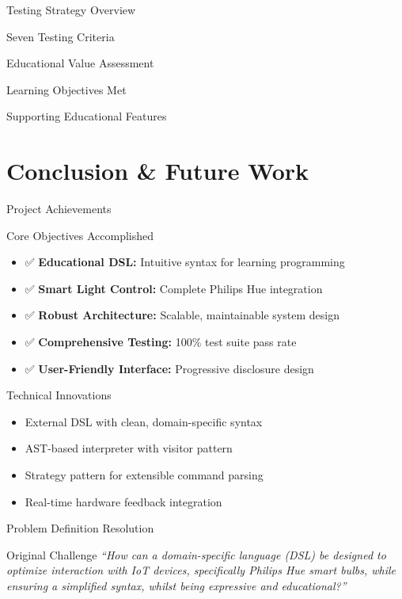 \documentclass{beamer}
\begin{document}
\begin{frame}{Testing Strategy Overview}
\begin{block}{Seven Testing Criteria}
\begin{frame}{Educational Value Assessment}
\begin{block}{Learning Objectives Met}
\begin{itemize}
\begin{block}{Supporting Educational Features}

\section{Conclusion \& Future Work}

\begin{frame}{Project Achievements}
\begin{block}{Core Objectives Accomplished}
\begin{itemize}
    \item ✅ \textbf{Educational DSL:} Intuitive syntax for learning programming
    \item ✅ \textbf{Smart Light Control:} Complete Philips Hue integration
    \item ✅ \textbf{Robust Architecture:} Scalable, maintainable system design
    \item ✅ \textbf{Comprehensive Testing:} 100\% test suite pass rate
    \item ✅ \textbf{User-Friendly Interface:} Progressive disclosure design
\end{itemize}
\end{block}

\begin{block}{Technical Innovations}
\begin{itemize}
    \item External DSL with clean, domain-specific syntax
    \item AST-based interpreter with visitor pattern
    \item Strategy pattern for extensible command parsing
    \item Real-time hardware feedback integration
\end{itemize}
\end{block}
\end{frame}

\begin{frame}{Problem Definition Resolution}
\begin{block}{Original Challenge}
\textit{``How can a domain-specific language (DSL) be designed to optimize interaction with IoT devices, specifically Philips Hue smart bulbs, while ensuring a simplified syntax, whilst being expressive and educational?''}
\end{block}


\end{frame}
\end{block}
\end{itemize}
\end{block}
\end{frame}
\end{block}
\end{frame}
\end{document}
